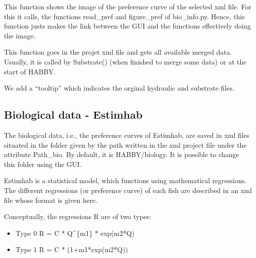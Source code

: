 \documentclass[letterpaper,10pt,english]{sphinxmanual}
\begin{document}
\begin{fulllineitems}
\begin{fulllineitems}
\end{fulllineitems}


\begin{fulllineitems}
\label{\detokenize{index:src_GUI.bio_info_GUI.BioInfo.show_pref}}
This function shows the image of the preference curve of the selected xml file. For this it calls, the functions
read\_pref and figure\_pref of bio\_info.py. Hence, this function justs makes the link between the GUI and
the functions effectively doing the image.

\end{fulllineitems}


\begin{fulllineitems}
\label{\detokenize{index:src_GUI.bio_info_GUI.BioInfo.update_merge_list}}
This function goes in the projet xml file and gets all available merged data. Usually, it is called
by Substrate() (when finished to merge some data) or at the start of HABBY.

We add a ``tooltip'' which indicates the orginal hydraulic and substrate files.

\end{fulllineitems}


\end{fulllineitems}



\subsection{Biological data - Estimhab}
\label{\detokenize{index:biological-data-estimhab}}
The biological data, i.e., the preference curves of Estimhab, are saved in xml files
situated in the folder given by the path written in the xml project file under the
attribute Path\_bio. By default, it is HABBY/biology. It is possible to change this folder
using the GUI.

Estimhab is a statistical model, which functions using mathematical regressions.
The different regressions (or preference curve) of each fish are described in an xml file
whose format is given here.

Conceptually, the regressions R are of two types:
\begin{itemize}
\item {} 
Type 0          R = C * Q\textasciicircum{}\{m1\} * exp(m2*Q)

\item {} 
Type 1          R = C * (1+m1*exp(m2*Q))

\end{itemize}
\end{document}
